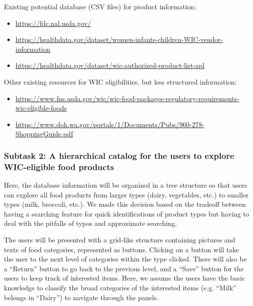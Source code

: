 \documentclass{article}
\begin{document}
Existing potential database (CSV files) for product information:
\begin{itemize}
    \item \href{https://fdc.nal.usda.gov/}{https://fdc.nal.usda.gov/}
    \item \href{https://healthdata.gov/dataset/women-infants-children-WIC-vendor-information}{https://healthdata.gov/dataset/women-infants-children-WIC-vendor-information}
    \item \href{https://healthdata.gov/dataset/wic-authorized-product-list-apl}{https://healthdata.gov/dataset/wic-authorized-product-list-apl}
\end{itemize}
Other existing resources for WIC eligibilities, but less structured information:
\begin{itemize}
    \item \href{https://www.fns.usda.gov/wic/wic-food-packages-regulatory-requirements-wic-eligible-foods}{https://www.fns.usda.gov/wic/wic-food-packages-regulatory-requirements-wic-eligible-foods}
    \item \href{https://www.doh.wa.gov/portals/1/Documents/Pubs/960-278-ShoppingGuide.pdf}{https://www.doh.wa.gov/portals/1/Documents/Pubs/960-278-ShoppingGuide.pdf}
\end{itemize}

\subsubsection*{Subtask 2: A hierarchical catalog for the users to explore WIC-eligible food products}
\label{sec:goal}
Here, the database information will be organized in a tree structure so that users can explore all food products from larger types (dairy, vegetables, etc.) to smaller types (milk, broccoli, etc.). We made this decision based on the tradeoff between having a searching feature for quick identifications of product types but having to deal with the pitfalls of typos and approximate searching.\par
The users will be presented with a grid-like structure containing pictures and texts of food categories, represented as buttons. Clicking on a button will take the user to the next level of categories within the type clicked. There will also be a “Return” button to go back to the previous level, and a “Save” button for the users to keep track of interested items. Here, we assume the users have the basic knowledge to classify the broad categories of the interested items (e.g. “Milk” belongs in “Dairy”) to navigate through the panels.
\end{document}

